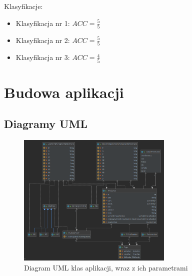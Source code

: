 \documentclass{classrep}
\begin{document}
Klasyfikacje:
\begin{itemize}
\item Klasyfikacja nr 1:
$ACC = \frac{5}{5}$ \\
\item Klasyfikacja nr 2:
$ACC = \frac{5}{5}$\\
\item Klasyfikacja nr 3:
$ACC = \frac{4}{5}$
\end{itemize}


\section{Budowa aplikacji}
\subsection{Diagramy UML}

\begin{figure}[ht]
\centering
\includegraphics[width=0.66\textwidth]{uml1.png}
\caption{Diagram UML klas aplikacji, wraz z ich parametrami}
\label{fig1}
\end{figure}
\end{document}
